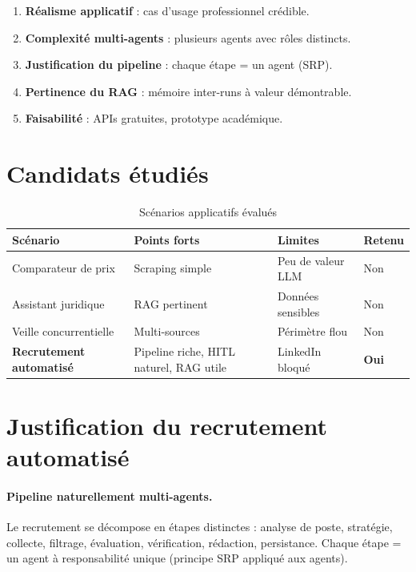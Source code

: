 \documentclass[12pt,a4paper]{report}
\begin{document}
\begin{enumerate}
  \item \textbf{Réalisme applicatif} : cas d'usage professionnel crédible.
  \item \textbf{Complexité multi-agents} : plusieurs agents avec rôles distincts.
  \item \textbf{Justification du pipeline} : chaque étape = un agent (SRP).
  \item \textbf{Pertinence du RAG} : mémoire inter-runs à valeur démontrable.
  \item \textbf{Faisabilité} : APIs gratuites, prototype académique.
\end{enumerate}

\section{Candidats étudiés}

\begin{table}[H]
\centering
\caption{Scénarios applicatifs évalués}
\label{tab:scenarios}
\begin{tabularx}{\textwidth}{L{3.2cm}L{3.8cm}L{4cm}C{1.8cm}}
\toprule
\textbf{Scénario} & \textbf{Points forts} & \textbf{Limites} & \textbf{Retenu} \\
\midrule
Comparateur de prix & Scraping simple & Peu de valeur LLM & Non \\
Assistant juridique & RAG pertinent & Données sensibles & Non \\
Veille concurrentielle & Multi-sources & Périmètre flou & Non \\
\textbf{Recrutement automatisé} & Pipeline riche, HITL naturel, RAG utile & LinkedIn bloqué & \textbf{Oui} \\
\bottomrule
\end{tabularx}
\end{table}

\section{Justification du recrutement automatisé}

\paragraph{Pipeline naturellement multi-agents.}
Le recrutement se décompose en étapes distinctes : analyse de poste, stratégie,
collecte, filtrage, évaluation, vérification, rédaction, persistance. Chaque étape
= un agent à responsabilité unique (principe SRP appliqué aux agents).
\end{document}
